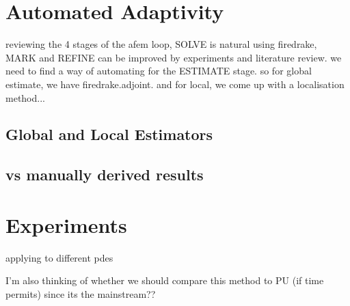 \chapter{Automated Adaptivity}
\label{chap:automated}

reviewing the 4 stages of the afem loop, SOLVE is natural using firedrake, MARK and REFINE can be improved by experiments and literature review. we need to find a way of automating for the ESTIMATE stage. so for global estimate, we have firedrake.adjoint. and for local, we come up with a localisation method...

\section{Global and Local Estimators}


\section{vs manually derived results}



\chapter{Experiments}

applying to different pdes

I'm also thinking of whether we should compare this method to PU (if time permits) since its the mainstream??